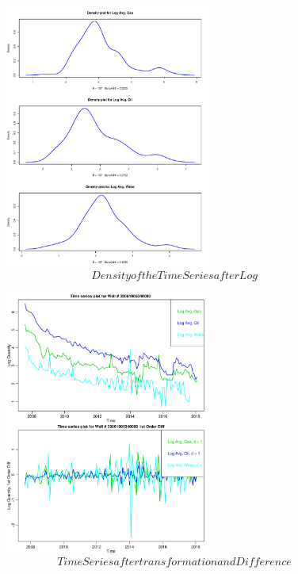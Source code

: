 \documentclass[a4paper]{article}
\begin{document}
\begin{figure}
	\centering
	\includegraphics[width=0.6\textwidth]{densitylog}
	\caption{$$Density of the Time Series after Log$$}
	\label{fig1:densitylog}
\end{figure}
\begin{figure}
	\centering
	\includegraphics[width=0.6\textwidth]{TSLoganddiff}
	\caption{$$Time Series after transformation and Difference$$}
	\label{fig1:TSLoganddiff}
\end{figure}
\end{document}
